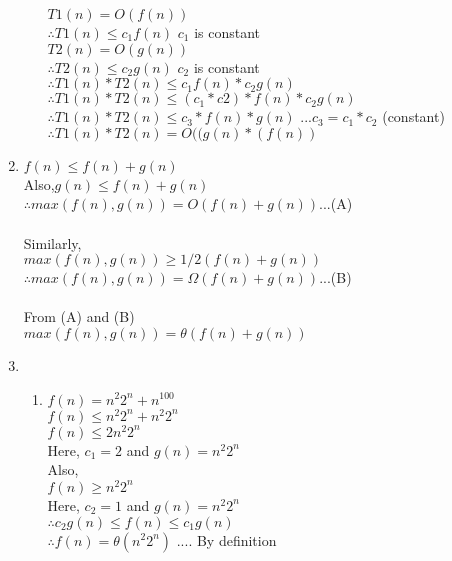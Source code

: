 \documentclass[12pt, a4paper]{article}
\begin{document}
\begin{enumerate}[label=(\alph*)]
\begin{enumerate}[label=(\alph*)]
	 		$T1(n) = O(f(n))$\\
	 		$\therefore T1(n) \leq c_1 f(n)$ \hspace{2cm} $c_1$ is constant\\
	 		
	 		$T2(n) = O(g(n))$\\
	 		$\therefore T2(n) \leq c_2 g(n)$ \hspace{2cm} $c_2$ is constant\\
	 		
	 		$\therefore T1(n)*T2(n)\leq c_1 f(n) * c_2 g(n)$\\
	 		$\therefore T1(n)*T2(n)\leq (c_1*c2) * f(n) * c_2 g(n)$\\
	 		$\therefore T1(n)*T2(n)\leq c_3 * f(n) * g(n)$\hspace{2cm} ...$c_3=c_1*c_2$ (constant)\\
	 		$\therefore T1(n) * T2(n) = O((g(n)*(f(n))$
	 			 		
	 	\end{enumerate}
 	
 	\item 
 	$f(n)\leq f(n)+g(n)$\\
 	Also,$g(n)\leq f(n)+g(n)$\\
 	$\therefore max(f(n),g(n))= O(f(n)+g(n))$\hspace{2cm}...(A)\\
 	\\
 	Similarly,\\
 	$max(f(n),g(n))\geq 1/2 (f(n)+g(n))$\\
 	$\therefore max(f(n),g(n))= \Omega(f(n)+g(n))$\hspace{2cm}...(B)\\
 	\\
 	From (A) and (B)\\
 	$max(f(n),g(n))= \theta(f(n)+g(n))$
 	
 	
 	\item 
 	\begin{enumerate}[label=(\alph*)]
 		\item $f(n) =  n^2 2^n + n^{100}$\\
 		$f(n) \leq  n^2 2^n + n^2 2^n$\\
 		$f(n) \leq 2n^2 2^n$\\
 		Here, $c_1 = 2$ and $g(n) = n^2 2^n$\\
 		Also, \\
 		$f(n) \geq  n^2 2^n $\\
 		Here, $c_2 = 1$ and $g(n) = n^2 2^n$\\
 		$\therefore c_2g(n)\leq f(n) \leq c_1g(n)$\\
 		$\therefore f(n) = \theta(n^2 2^n)$     \hspace{2cm} .... By definition\\
 		

\end{enumerate}
\end{enumerate}
\end{document}
